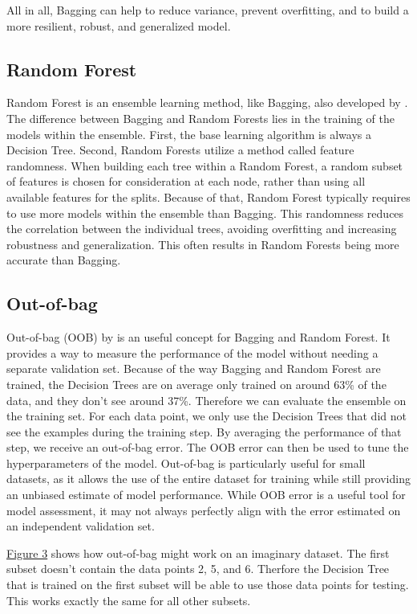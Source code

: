 All in all, Bagging can help to reduce variance, prevent overfitting, and to build
a more resilient, robust, and generalized model.

\subsection{Random Forest}
Random Forest is an ensemble learning method, like Bagging, also developed
by \citet{breiman2001random}. The difference between Bagging and Random Forests
lies in the training of the models within the ensemble. 
First, the base learning algorithm is always a Decision Tree. 
Second, Random Forests utilize a method called feature randomness. When building
each tree within a Random Forest, a random subset of features is chosen for consideration
at each node, rather than using all available features for the splits.
Because of that, Random Forest typically requires to use more models within the ensemble
than Bagging.
This randomness reduces the correlation between the individual trees, avoiding
overfitting and increasing robustness and generalization. This often results in
Random Forests being more accurate than Bagging.

\subsection{Out-of-bag}

Out-of-bag (OOB) by \citet{breiman1996out} is an useful concept for Bagging and Random Forest. 
It provides a way to measure the performance of the model without needing a separate validation set. 
Because of the way Bagging and Random Forest are trained, the Decision Trees are on average
only trained on around 63\% of the data, and they don't see around 37\%. 
Therefore we can evaluate the ensemble on the training set. For each data point, we only use
the Decision Trees that did not see the examples during the training step. By averaging the
performance of that step, we receive an out-of-bag error.
The OOB error can then be used to tune the hyperparameters of the model. Out-of-bag is particularly
useful for small datasets, as it allows the use of the entire dataset for training while still
providing an unbiased estimate of model performance.
While OOB error is a useful tool for model assessment, it may not always perfectly align with the
error estimated on an independent validation set.

\hyperref[fig:oob]{Figure 3} shows how out-of-bag might work on an imaginary dataset.
The first subset doesn't contain the data points 2, 5, and 6. Therfore the Decision
Tree that is trained on the first subset will be able to use those data points for testing.
This works exactly the same for all other subsets.

